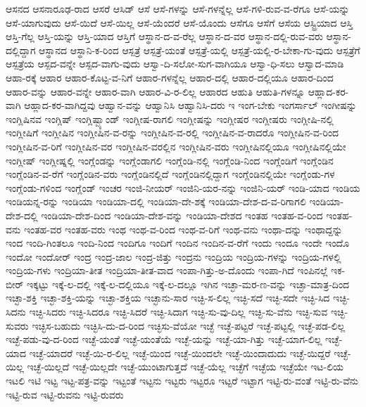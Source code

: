{ಆಸನದ
ಆಸನಾರೂಢ-ರಾದ
ಆಸರೆ
ಆಸಿಡ್
ಆಸೆ
ಆಸೆ-ಗಳನ್ನು
ಆಸೆ-ಗಳನ್ನೆಲ್ಲ
ಆಸೆ-ಗಳಿ-ರುವ-ವ-ರೆಗೂ
ಆಸೆ-ಯನ್ನು
ಆಸೆ-ಯಾಗುವುದು
ಆಸೆ-ಯಿದೆ
ಆಸೆ-ಯಿಲ್ಲ
ಆಸೆ-ಯೆಂದರೆ
ಆಸೆ-ಯೊಂದು
ಆಸೆಗೂ
ಆಸೆಗೆ
ಆಸೆಯ
ಆಸ್ಟ್ರಿಯಾದ
ಆಸ್ತಿ
ಆಸ್ತಿ-ಗೆಲ್ಲ
ಆಸ್ತಿ-ಯನ್ನು
ಆಸ್ತಿ-ಯಾದ
ಆಸ್ತಿಗೆ
ಆಸ್ಥಾನ-ದ-ವ-ರೆಲ್ಲ
ಆಸ್ಥಾನ-ದ-ವರ
ಆಸ್ಥಾನ-ದಲ್ಲಿ-ರುವ-ವರು
ಆಸ್ಥಾನ-ದಲ್ಲಿದ್ದಾಗ
ಆಸ್ಥಾನದ
ಆಸ್ಥಾನಿ-ಕ-ರಿಂದ
ಆಸ್ಪತ್ರೆ
ಆಸ್ಪತ್ರೆ-ಯಂತೆ
ಆಸ್ಪತ್ರೆ-ಯಲ್ಲಿ
ಆಸ್ಪತ್ರೆ-ಯಲ್ಲಿ-ರ-ಬೇಕಾ-ಗು-ವುದು
ಆಸ್ಪತ್ರೆಗೆ
ಆಸ್ಪತ್ರೆಯ
ಆಸ್ಪದ-ವನ್ನೇ
ಆಸ್ಪದ-ವಾಗು-ವುದು
ಆಸ್ವಾ-ದಿ-ಸಲೋ-ಸುಗ-ವಾಗಿಯೂ
ಆಸ್ವಾ-ಧಿ-ಸಲು
ಆಸ್ವಾದ-ಮಾಡಿ
ಆಹಾ-ರಕ್ಕೆ
ಆಹಾರ
ಆಹಾರ-ಕೊಟ್ಟ-ವ-ನಿಗೆ
ಆಹಾರ-ಗಳನ್ನೆಲ್ಲ
ಆಹಾರ-ದಲ್ಲಿ
ಆಹಾರ-ದಲ್ಲಿಯೂ
ಆಹಾರ-ದಿಂದ
ಆಹಾರ-ವನ್ನು
ಆಹಾರ-ವನ್ನೇ
ಆಹಾರ-ವಾಗಿ
ಆಹಾರ-ವಿ-ರ-ಲಿಲ್ಲ
ಆಹಾರದ
ಆಹುತಿ
ಆಹುತಿ-ಗಳನ್ನೂ
ಆಹ್ಲಾದ-ಕರ-ವಾಗಿ
ಆಹ್ಲಾದ-ಕರ-ವಾಗಿದ್ದವು
ಆಹ್ವಾನ-ವನ್ನು
ಆಹ್ವಾನಿಸಿ
ಆಹ್ವಾನಿಸಿ-ದರು
ಇ
ಇಂಗ-ಬೇಕು
ಇಂಗರ್ಸಾಲ್
ಇಂಗೀಷನ್ನು
ಇಂಗ್ಲಿಷಿನವ
ಇಂಗ್ಲಿಷ್
ಇಂಗ್ಲಿಷ್ಬ್ಯಾಂಡ್
ಇಂಗ್ಲೀಷ-ರಾಗಲಿ
ಇಂಗ್ಲೀಷನ್ನು
ಇಂಗ್ಲೀಷರ
ಇಂಗ್ಲೀಷರು
ಇಂಗ್ಲೀಷಿ-ನಲ್ಲಿ
ಇಂಗ್ಲೀಷಿಗೆ
ಇಂಗ್ಲೀಷಿನ
ಇಂಗ್ಲೀಷಿನ-ವ-ರನ್ನು
ಇಂಗ್ಲೀಷಿನ-ವ-ರಲ್ಲಿ
ಇಂಗ್ಲೀಷಿನ-ವ-ರಾದರೊ
ಇಂಗ್ಲೀಷಿನ-ವ-ರಿಂದ
ಇಂಗ್ಲೀಷಿನ-ವ-ರಿಗೆ
ಇಂಗ್ಲೀಷಿನ-ವರ
ಇಂಗ್ಲೀಷಿನ-ವರಲ್ಲಿನ
ಇಂಗ್ಲೀಷಿನ-ವರು
ಇಂಗ್ಲೀಷಿನಲ್ಲಿಯೂ
ಇಂಗ್ಲೀಷಿನಲ್ಲಿಯೇ
ಇಂಗ್ಲೀಷ್
ಇಂಗ್ಲೀಷ್ನಲ್ಲಿ
ಇಂಗ್ಲೆಂಡನ್ನು
ಇಂಗ್ಲೆಂಡಾಗಲಿ
ಇಂಗ್ಲೆಂಡಿ-ನಲ್ಲಿ
ಇಂಗ್ಲೆಂಡಿ-ನಿಂದ
ಇಂಗ್ಲೆಂಡಿಗೆ
ಇಂಗ್ಲೆಂಡಿನ
ಇಂಗ್ಲೆಂಡಿನ-ವ-ರೆಗೆ
ಇಂಗ್ಲೆಂಡಿನ-ವರು
ಇಂಗ್ಲೆಂಡಿನಲ್ಲಿದೆ
ಇಂಗ್ಲೆಂಡಿನಲ್ಲಿದ್ದಾಗ
ಇಂಗ್ಲೆಂಡಿನಲ್ಲಿಯೇ
ಇಂಗ್ಲೆಂಡು-ಗಳ
ಇಂಗ್ಲೆಂಡು-ಗಳಿಂದ
ಇಂಗ್ಲೆಂಡ್
ಇಂಚರ
ಇಂಜಿ-ನೀಯರ್
ಇಂಜಿನಿ-ಯರ-ನನ್ನು
ಇಂಜಿನಿ-ಯರ್
ಇಂಡಿ-ಯಾದ
ಇಂಡಿಯ
ಇಂಡಿಯನ್ನ-ರನ್ನು
ಇಂಡಿಯಾ
ಇಂಡಿಯಾ-ದಲ್ಲಿ
ಇಂಡಿಯಾ-ದೇ-ಶಕ್ಕೆ
ಇಂಡಿಯಾ-ದೇಶ-ದ-ವ-ರಿಗಾಗಲಿ
ಇಂಡಿಯಾ-ದೇಶ-ದಲ್ಲಿ
ಇಂಡಿಯಾ-ದೇಶ-ದಿಂದ
ಇಂಡಿಯಾ-ದೇಶ-ವನ್ನು
ಇಂಡಿಯಾ-ದೇಶದ
ಇಂತಹ
ಇಂತಹ-ವ-ರಿಂದ
ಇಂತಹ-ವನು
ಇಂತಹ-ವರ
ಇಂತಹ-ವರು
ಇಂಥ
ಇಂಥ-ವ-ರಿಂದ
ಇಂಥ-ವ-ರಿಗೆ
ಇಂಥ-ವನು
ಇಂಥಾ-ದನ್ನು
ಇಂಥಾದ್ದನ್ನು
ಇಂದ
ಇಂದಿ-ಗಿಂತಲೂ
ಇಂದಿ-ನಿಂದ
ಇಂದಿಗೂ
ಇಂದಿಗೆ
ಇಂದಿನ
ಇಂದಿನ-ವ-ರೆಗೆ
ಇಂದು
ಇಂದೂ
ಇಂದೇ
ಇಂದೊ
ಇಂದೋ
ಇಂದೋರ್
ಇಂದ್ರ
ಇಂದ್ರ-ಜಾಲ
ಇಂದ್ರ-ಜಿತ್ತು
ಇಂದ್ರನು
ಇಂದ್ರಿಯ
ಇಂದ್ರಿಯ-ಗಳನ್ನು
ಇಂದ್ರಿಯ-ಗಳಲ್ಲಿ
ಇಂದ್ರಿಯ-ಗಳು
ಇಂದ್ರಿಯಾ-ತೀತ
ಇಂದ್ರಿಯಾ-ತೀತ-ವಾದ
ಇಂಪಾ-ಗಿತ್ತು-ಅ-ದೊಂದು
ಇಂಪಾ-ಗಿದೆ
ಇಂಪಿನಲ್ಲೆ
ಇಕ-ಬೀರ್
ಇಕ್ಕಟ್ಟು
ಇಕ್ಕೆ-ಲ-ದಲ್ಲಿ
ಇಕ್ಕೆ-ಲ-ದಲ್ಲಿಯೂ
ಇಕ್ಕೆ-ಲ-ದಲ್ಲೂ
ಇಗಿನ
ಇಚ್ಛಾ-ಮರ-ಣ-ವನ್ನು
ಇಚ್ಛಾ-ಮಾತ್ರ-ದಿಂದ
ಇಚ್ಛಾ-ಶಕ್ತಿ
ಇಚ್ಛಾ-ಶಕ್ತಿ-ಯನ್ನು
ಇಚ್ಛಾ-ಶಕ್ತಿಯ
ಇಚ್ಛಾನು-ಸಾರ
ಇಚ್ಛಿ-ಸ-ಲಿಲ್ಲ
ಇಚ್ಛಿ-ಸದೆ
ಇಚ್ಛಿ-ಸದೇ
ಇಚ್ಛಿ-ಸಿದ
ಇಚ್ಛಿ-ಸಿದನು
ಇಚ್ಛಿ-ಸಿದರು
ಇಚ್ಛಿ-ಸಿದರೂ
ಇಚ್ಛಿ-ಸಿದರೆ
ಇಚ್ಛಿ-ಸಿದಾಗ
ಇಚ್ಛಿ-ಸು-ವು-ದಿಲ್ಲ
ಇಚ್ಛಿ-ಸು-ವೆನು
ಇಚ್ಛಿ-ಸುವ
ಇಚ್ಛಿ-ಸುವರು
ಇಚ್ಛಿಸ-ಬಹುದು
ಇಚ್ಛಿಸಿ-ದು-ದ-ರಿಂದ
ಇಚ್ಛಿಸು-ವೆಯೋ
ಇಚ್ಛೆ
ಇಚ್ಛೆ-ಪಟ್ಟರೆ
ಇಚ್ಛೆ-ಪಟ್ಟಲ್ಲಿ
ಇಚ್ಛೆ-ಪಡ-ಲಿಲ್ಲ
ಇಚ್ಛೆ-ಪಡು-ವು-ದ-ರಿಂದ
ಇಚ್ಛೆ-ಯಂತೆ
ಇಚ್ಛೆ-ಯಂತೆಯೆ
ಇಚ್ಛೆ-ಯನ್ನು
ಇಚ್ಛೆ-ಯಾ-ಗಿತ್ತು
ಇಚ್ಛೆ-ಯಾಗ-ಲಿಲ್ಲ
ಇಚ್ಛೆ-ಯಾದ
ಇಚ್ಛೆ-ಯಾದರೆ
ಇಚ್ಛೆ-ಯಿ-ರ-ಲಿಲ್ಲ
ಇಚ್ಛೆ-ಯಿಂದ
ಇಚ್ಛೆ-ಯಿಂದಲೇ
ಇಚ್ಛೆ-ಯಿಂದಾದುದು
ಇಚ್ಛೆ-ಯಿದ್ದರೆ
ಇಚ್ಛೆ-ಯಿಲ್ಲ
ಇಚ್ಛೆ-ಯಿಲ್ಲದೆ
ಇಚ್ಛೆ-ಯಿಲ್ಲದೇ
ಇಚ್ಛೆ-ಯುಂಟಾಗುತ್ತದೆ
ಇಚ್ಛೆ-ಯೆಲ್ಲ
ಇಚ್ಛೆಗೆ
ಇಚ್ಛೆಯ
ಇಚ್ಛೆಯೇ
ಇಟ-ಲಿಯ
ಇಟಲಿ
ಇಟಿ
ಇಟ್ಟ
ಇಟ್ಟ-ಪತ್ರ-ವನ್ನು
ಇಟ್ಟಂತೆ
ಇಟ್ಟನು
ಇಟ್ಟರು
ಇಟ್ಟರೂ
ಇಟ್ಟರೆ
ಇಟ್ಟಾಗ
ಇಟ್ಟಿ-ರು-ವಂತೆ
ಇಟ್ಟಿ-ರು-ವೆನು
ಇಟ್ಟಿ-ರುವ
ಇಟ್ಟಿ-ರುವನು
ಇಟ್ಟಿ-ರುವರು
}
